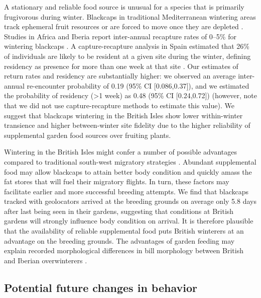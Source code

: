 \documentclass[a4paper, nobind]{templates/ociamthesis}
\begin{document}
A stationary and reliable food source is unusual for a species that is primarily frugivorous during winter. Blackcaps in traditional Mediterranean wintering areas track ephemeral fruit resources or are forced to move once they are depleted \autocite{reySpatiotemporalVariationFruit1995,telleriaFruitTrackingSites2008,beldaResidentTransientDynamics2007,cuadradoYearYearRecurrence1992}. Studies in Africa and Iberia report inter-annual recapture rates of 0--5\% for wintering blackcaps \autocite{cuadradoAllBlackcapsSylvia1995,cuadradoYearYearRecurrence1992,kingSiteFidelityRecurrence2001,loveiMigrationWinteringBlackcap1985}. A capture-recapture analysis in Spain estimated that 26\% of individuals are likely to be resident at a given site during the winter, defining residency as presence for more than one week at that site \autocite{beldaResidentTransientDynamics2007}. Our estimates of return rates and residency are substantially higher: we observed an average inter-annual re-encounter probability of 0.19 (95\% CI {[}0.086,0.37{]}), and we estimated the probability of residency (\textgreater1 week) as 0.48 (95\% CI {[}0.24,0.72{]}) (however, note that we did not use capture-recapture methods to estimate this value). We suggest that blackcaps wintering in the British Isles show lower within-winter transience and higher between-winter site fidelity due to the higher reliability of supplemental garden food sources over fruiting plants.

Wintering in the British Isles might confer a number of possible advantages compared to traditional south-west migratory strategies \autocite{bertholdMigratoryBehaviourPopulation1988}. Abundant supplemental food may allow blackcaps to attain better body condition and quickly amass the fat stores that will fuel their migratory flights. In turn, these factors may facilitate earlier and more successful breeding attempts. We find that blackcaps tracked with geolocators arrived at the breeding grounds on average only 5.8 days after last being seen in their gardens, suggesting that conditions at British gardens will strongly influence body condition on arrival. It is therefore plausible that the availability of reliable supplemental food puts British winterers at an advantage on the breeding grounds. The advantages of garden feeding may explain recorded morphological differences in bill morphology between British and Iberian overwinterers \autocite{rolshausenContemporaryEvolutionReproductive2009}.

\hypertarget{potential-future-changes-in-behavior}{%
\subsection{Potential future changes in behavior}\label{potential-future-changes-in-behavior}}
\end{document}
